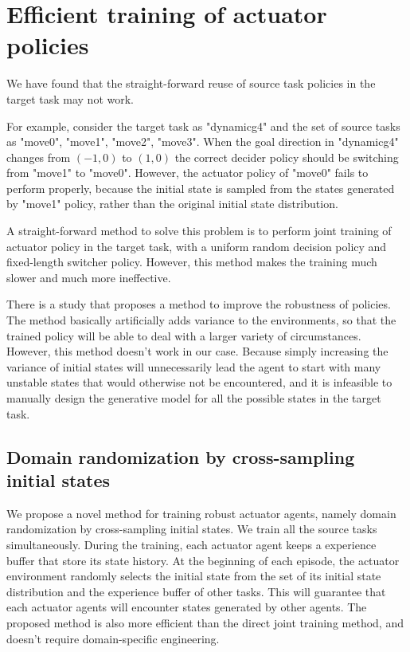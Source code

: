 
\section{Efficient training of actuator policies}
We have found that the straight-forward reuse of source task policies in the target task may not work.

For example, consider the target task as "dynamicg4" and the set of source tasks as "move0", "move1", "move2", "move3". When the goal direction in "dynamicg4" changes from $(-1,0)$ to $(1,0)$ the correct decider policy should be switching from "move1" to "move0". However, the actuator policy of "move0" fails to perform properly, because the initial state is sampled from the states generated by "move1" policy, rather than the original initial state distribution.

A straight-forward method to solve this problem is to perform joint training of actuator policy in the target task, with a uniform random decision policy and fixed-length switcher policy. However, this method makes the training much slower and much more ineffective.

There is a study \cite{tobin2017domain} that proposes a method to improve the robustness of policies. The method basically artificially adds variance to the environments, so that the trained policy will be able to deal with a larger variety of circumstances. However, this method doesn't work in our case. Because simply increasing the variance of initial states will unnecessarily lead the agent to start with many unstable states that would otherwise not be encountered, and it is infeasible to manually design the generative model for all the possible states in the target task.

\subsection{Domain randomization by cross-sampling initial states}
We propose a novel method for training robust actuator agents, namely domain randomization by cross-sampling initial states. We train all the source tasks simultaneously. During the training, each actuator agent keeps a experience buffer that store its state history. At the beginning of each episode, the actuator environment randomly selects the initial state from the set of its initial state distribution and the experience buffer of other tasks. This will guarantee that each actuator agents will encounter states generated by other agents. The proposed method is also more efficient than the direct joint training method, and doesn't require domain-specific engineering.

